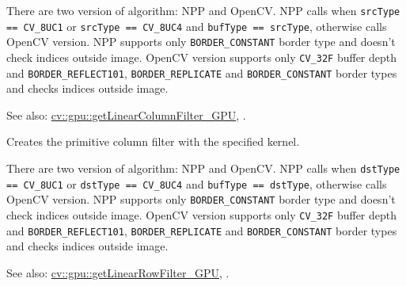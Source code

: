 There are two version of algorithm: NPP and OpenCV. NPP calls when \texttt{srcType == CV\_8UC1} or \texttt{srcType == CV\_8UC4} and \texttt{bufType == srcType}, otherwise calls OpenCV version. NPP supports only \texttt{BORDER\_CONSTANT} border type and doesn't check indices outside image. OpenCV version supports only \texttt{CV\_32F} buffer depth and \texttt{BORDER\_REFLECT101}, \texttt{BORDER\_REPLICATE} and \texttt{BORDER\_CONSTANT} border types and checks indices outside image.

See also: \hyperref[cppfunc.gpu.getLinearColumnFilter]{cv::gpu::getLinearColumnFilter\_GPU}, .


\label{cppfunc.gpu.getLinearColumnFilter}
Creates the primitive column filter with the specified kernel.


\begin{description}
\end{description}

There are two version of algorithm: NPP and OpenCV. NPP calls when \texttt{dstType == CV\_8UC1} or \texttt{dstType == CV\_8UC4} and \texttt{bufType == dstType}, otherwise calls OpenCV version. NPP supports only \texttt{BORDER\_CONSTANT} border type and doesn't check indices outside image. OpenCV version supports only \texttt{CV\_32F} buffer depth and \texttt{BORDER\_REFLECT101}, \texttt{BORDER\_REPLICATE} and \texttt{BORDER\_CONSTANT} border types and checks indices outside image.\newline

See also: \hyperref[cppfunc.gpu.getLinearRowFilter]{cv::gpu::getLinearRowFilter\_GPU}, .


